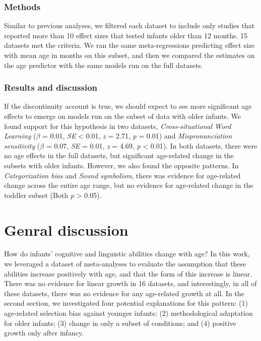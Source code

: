 \documentclass[
  man]{apa6}
\begin{document}
\hypertarget{methods-4}{%
\subsubsection{Methods}\label{methods-4}}

Similar to previous analyses, we filtered each dataset to include only studies that reported more than 10 effect sizes that tested infants older than 12 months. 15 datasets met the criteria. We ran the same meta-regressions predicting effect size with mean age in months on this subset, and then we compared the estimates on the age predictor with the same models run on the full datasets.

\hypertarget{results-and-discussion-3}{%
\subsubsection{Results and discussion}\label{results-and-discussion-3}}

If the discontinuity account is true, we should expect to see more significant age effects to emerge on models run on the subset of data with older infants. We found support for this hypothesis in two datasets, \emph{Cross-situational Word Learning} (\(\beta\) = 0.01, \emph{SE} \textless{} 0.01, \emph{z} = 2.71, \emph{p} = 0.01) and \emph{Mispronunciation sensitivity} (\(\beta\) = 0.07, \emph{SE} = 0.01, \emph{z} = 4.69, \emph{p} \textless{} 0.01). In both datasets, there were no age effects in the full datasets, but significant age-related change in the subsets with older infants. However, we also found the opposite patterns. In \emph{Categorization bias} and \emph{Sound symbolism}, there was evidence for age-related change across the entire age range, but no evidence for age-related change in the toddler subset (Both \emph{p} \textgreater{} 0.05).

\hypertarget{genral-discussion}{%
\section{Genral discussion}\label{genral-discussion}}

How do infants' cognitive and linguistic abilities change with age? In this work, we leveraged a dataset of meta-analyses to evaluate the assumption that these abilities increase positively with age, and that the form of this increase is linear. There was no evidence for linear growth in 16 datasets, and interestingly, in all of these datasets, there was no evidence for any age-related growth at all. In the second section, we investigated four potential explanations for this pattern: (1) age-related selection bias against younger infants; (2) methodological adaptation for older infants; (3) change in only a subset of conditions; and (4) positive growth only after infancy.
\end{document}
